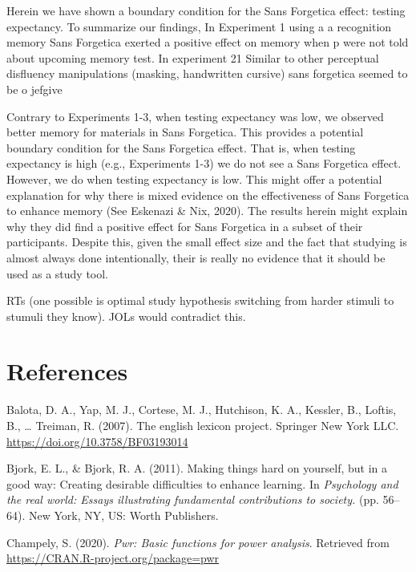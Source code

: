 \documentclass[
  english,
  man]{apa6}
\begin{document}
Herein we have shown a boundary condition for the Sans Forgetica effect: testing expectancy. To summarize our findings, In Experiment 1 using a a recognition memory Sans Forgetica exerted a positive effect on memory when p were not told about upcoming memory test. In experiment 21 Similar to other perceptual disfluency manipulations (masking, handwritten cursive) sans forgetica seemed to be o jefgive

Contrary to Experiments 1-3, when testing expectancy was low, we observed better memory for materials in Sans Forgetica. This provides a potential boundary condition for the Sans Forgetica effect. That is, when testing expectancy is high (e.g., Experiments 1-3) we do not see a Sans Forgetica effect. However, we do when testing expectancy is low. This might offer a potential explanation for why there is mixed evidence on the effectiveness of Sans Forgetica to enhance memory (See Eskenazi \& Nix, 2020). The results herein might explain why they did find a positive effect for Sans Forgetica in a subset of their participants. Despite this, given the small effect size and the fact that studying is almost always done intentionally, their is really no evidence that it should be used as a study tool.

RTs (one possible is optimal study hypothesis switching from harder stimuli to stumuli they know). JOLs would contradict this.

\newpage

\hypertarget{references}{%
\section{References}\label{references}}

\begingroup
\setlength{\parindent}{-0.5in}
\setlength{\leftskip}{0.5in}

\hypertarget{refs}{}
\leavevmode\hypertarget{ref-Balota2007}{}%
Balota, D. A., Yap, M. J., Cortese, M. J., Hutchison, K. A., Kessler, B., Loftis, B., \ldots{} Treiman, R. (2007). The english lexicon project. Springer New York LLC. \url{https://doi.org/10.3758/BF03193014}

\leavevmode\hypertarget{ref-Bjork2011}{}%
Bjork, E. L., \& Bjork, R. A. (2011). Making things hard on yourself, but in a good way: Creating desirable difficulties to enhance learning. In \emph{Psychology and the real world: Essays illustrating fundamental contributions to society.} (pp. 56--64). New York, NY, US: Worth Publishers.

\leavevmode\hypertarget{ref-Champely2020}{}%
Champely, S. (2020). \emph{Pwr: Basic functions for power analysis}. Retrieved from \url{https://CRAN.R-project.org/package=pwr}
\end{document}
